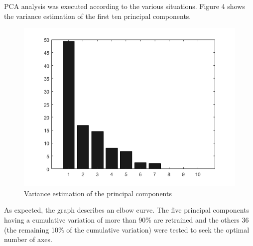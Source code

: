 \documentclass[twocolumn,11pt]{asme2ej}
\begin{document}
PCA analysis was executed according to the various situations. Figure 4 shows the variance estimation of the first ten principal components. 
\begin{figure}[h]
\centering
\includegraphics[scale=0.52]{Variance_estimation.png}
\caption{Variance estimation of the principal
components}
\end{figure}
As expected, the graph describes an elbow curve. The five principal components having a cumulative variation of more than 90\% are retrained and the others 36 (the remaining 10\% of the cumulative variation) were tested to seek the optimal number of axes.
\end{document}
